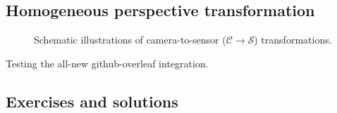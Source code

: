 \documentclass[draft]{CVCN}
\begin{document}
\subsection{Homogeneous perspective transformation}

\begin{figure}
    \centering
    
    \caption{Schematic illustrations of camera-to-sensor (\(\mathcal{C}\rightarrow\mathcal{S}\)) transformations.}%
    \label{fig:homocoords-perspectivetransform}
\end{figure}

Testing the all-new github-overleaf integration.


\subsection{Exercises and solutions}

\printsolutions\
\end{document}
